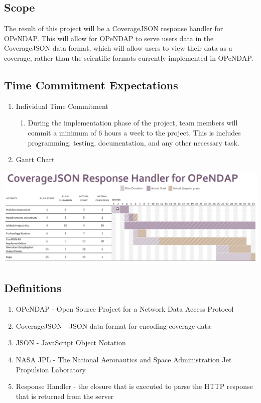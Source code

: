 \documentclass[onecolumn, draftclsnofoot,10pt, compsoc]{IEEEtran}
\begin{document}
\subsection{Scope}
The result of this project will be a CoverageJSON response handler for OPeNDAP. This will allow for OPeNDAP to serve users data in the CoverageJSON data format, which will allow users to view their data as a coverage, rather than the scientific formats currently implemented in OPeNDAP.

\subsection{Time Commitment Expectations}
\begin{enumerate}
\item Individual Time Commitment
\begin{enumerate}
\item During the implementation phase of the project, team members will commit a minimum of 6 hours a week to the project. This is includes programming, testing, documentation, and any other necessary task.\\
\end{enumerate}
\item Gantt Chart\\
\end{enumerate}
\includegraphics[width=\textwidth]{CS461_Gantt.png}

\subsection{Definitions}
\begin{enumerate}
\item OPeNDAP - Open Source Project for a Network Data Access Protocol
\item CoverageJSON - JSON data format for encoding coverage data
\item JSON - JavaScript Object Notation
\item NASA JPL - The National Aeronautics and Space Administration Jet Propulsion Laboratory
\item Response Handler - the closure that is executed to parse the HTTP response that is returned from the server
\end{enumerate}
\end{document}
